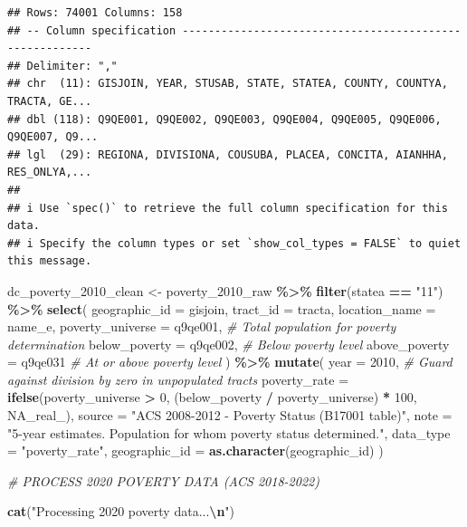 \documentclass[
]{article}
\newenvironment{Shaded}{\begin{snugshade}}{\end{snugshade}}
\newcommand{\AttributeTok}[1]{\textcolor[rgb]{0.13,0.29,0.53}{#1}}
\newcommand{\CommentTok}[1]{\textcolor[rgb]{0.56,0.35,0.01}{\textit{#1}}}
\newcommand{\ConstantTok}[1]{\textcolor[rgb]{0.56,0.35,0.01}{#1}}
\newcommand{\DecValTok}[1]{\textcolor[rgb]{0.00,0.00,0.81}{#1}}
\newcommand{\FunctionTok}[1]{\textcolor[rgb]{0.13,0.29,0.53}{\textbf{#1}}}
\newcommand{\NormalTok}[1]{#1}
\newcommand{\OtherTok}[1]{\textcolor[rgb]{0.56,0.35,0.01}{#1}}
\newcommand{\SpecialCharTok}[1]{\textcolor[rgb]{0.81,0.36,0.00}{\textbf{#1}}}
\newcommand{\StringTok}[1]{\textcolor[rgb]{0.31,0.60,0.02}{#1}}
\begin{document}
\begin{verbatim}
## Rows: 74001 Columns: 158
## -- Column specification --------------------------------------------------------
## Delimiter: ","
## chr  (11): GISJOIN, YEAR, STUSAB, STATE, STATEA, COUNTY, COUNTYA, TRACTA, GE...
## dbl (118): Q9QE001, Q9QE002, Q9QE003, Q9QE004, Q9QE005, Q9QE006, Q9QE007, Q9...
## lgl  (29): REGIONA, DIVISIONA, COUSUBA, PLACEA, CONCITA, AIANHHA, RES_ONLYA,...
## 
## i Use `spec()` to retrieve the full column specification for this data.
## i Specify the column types or set `show_col_types = FALSE` to quiet this message.
\end{verbatim}

\begin{Shaded}
\begin{Highlighting}[]
\NormalTok{dc\_poverty\_2010\_clean }\OtherTok{\textless{}{-}}\NormalTok{ poverty\_2010\_raw }\SpecialCharTok{\%\textgreater{}\%}
  \FunctionTok{filter}\NormalTok{(statea }\SpecialCharTok{==} \StringTok{"11"}\NormalTok{) }\SpecialCharTok{\%\textgreater{}\%}
  \FunctionTok{select}\NormalTok{(}
    \AttributeTok{geographic\_id =}\NormalTok{ gisjoin,}
    \AttributeTok{tract\_id =}\NormalTok{ tracta,}
    \AttributeTok{location\_name =}\NormalTok{ name\_e,}
    \AttributeTok{poverty\_universe =}\NormalTok{ q9qe001,   }\CommentTok{\# Total population for poverty determination}
    \AttributeTok{below\_poverty =}\NormalTok{ q9qe002,      }\CommentTok{\# Below poverty level}
    \AttributeTok{above\_poverty =}\NormalTok{ q9qe031       }\CommentTok{\# At or above poverty level}
\NormalTok{  ) }\SpecialCharTok{\%\textgreater{}\%}
  \FunctionTok{mutate}\NormalTok{(}
    \AttributeTok{year =} \DecValTok{2010}\NormalTok{,}
    \CommentTok{\# Guard against division by zero in unpopulated tracts}
    \AttributeTok{poverty\_rate =} \FunctionTok{ifelse}\NormalTok{(poverty\_universe }\SpecialCharTok{\textgreater{}} \DecValTok{0}\NormalTok{, (below\_poverty }\SpecialCharTok{/}\NormalTok{ poverty\_universe) }\SpecialCharTok{*} \DecValTok{100}\NormalTok{, }\ConstantTok{NA\_real\_}\NormalTok{),}
    \AttributeTok{source =} \StringTok{"ACS 2008{-}2012 {-} Poverty Status (B17001 table)"}\NormalTok{,}
    \AttributeTok{note =} \StringTok{"5{-}year estimates. Population for whom poverty status determined."}\NormalTok{,}
    \AttributeTok{data\_type =} \StringTok{"poverty\_rate"}\NormalTok{,}
    \AttributeTok{geographic\_id =} \FunctionTok{as.character}\NormalTok{(geographic\_id)}
\NormalTok{  )}

\CommentTok{\# PROCESS 2020 POVERTY DATA (ACS 2018{-}2022)}

\FunctionTok{cat}\NormalTok{(}\StringTok{"Processing 2020 poverty data...}\SpecialCharTok{\textbackslash{}n}\StringTok{"}\NormalTok{)}
\end{Highlighting}
\end{Shaded}
\end{document}

